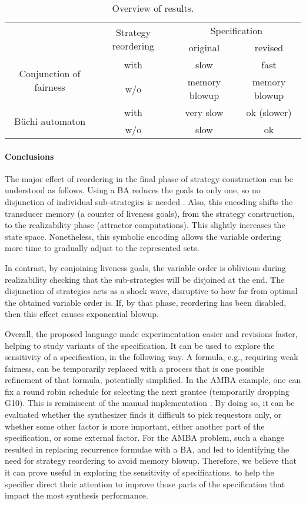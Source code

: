 \documentclass[copyright]{eptcs}
\begin{document}
\begin{table}
\caption{Overview of results.}
\label{tab:results-overview}
\centering
\begin{tabular}{cccc}
\toprule
& \multirow{2}{1.5cm}{Strategy reordering} & \multicolumn{2}{c}{Specification}\\
& & original & revised\\
\midrule
\multirow{2}{*}{Conjunction of fairness} & with & slow & fast\\
& w/o & memory blowup & memory blowup\\
\midrule
\multirow{2}{*}{B\"{u}chi automaton} & with & very slow & ok (slower)\\
& w/o & slow & ok\\
\bottomrule
\end{tabular}
\end{table}


\paragraph{Conclusions}

The major effect of reordering in the final phase of strategy construction can be understood as follows.
Using a BA reduces the goals to only one, so no disjunction of individual sub-strategies is needed \cite{Piterman06}.
Also, this encoding shifts the transducer memory (a counter of liveness goals), from the strategy construction, to the realizability phase (attractor computations).
This slightly increases the state space.
Nonetheless, this symbolic encoding allows the variable ordering more time to gradually adjust to the represented sets.

In contrast, by conjoining liveness goals, the variable order is oblivious during realizability checking that the sub-strategies will be disjoined at the end.
The disjunction of strategies acts as a shock wave, disruptive to how far from optimal the obtained variable order is.
If, by that phase, reordering has been disabled, then this effect causes exponential blowup.

Overall, the proposed language made experimentation easier and revisions faster, helping to study variants of the specification.
It can be used to explore the sensitivity of a specification, in the following way.
A formula, e.g., requiring weak fairness, can be temporarily replaced with a process that is one possible refinement of that formula, potentially simplified.
In the AMBA example, one can fix a round robin schedule for selecting the next grantee (temporarily dropping G10).
This is reminiscent of the manual implementation \cite{Bloem12jcss}.
By doing so, it can be evaluated whether the synthesizer finds it difficult to pick requestors only, or whether some other factor is more important, either another part of the specification, or some external factor.
For the AMBA problem, such a change resulted in replacing recurrence formulae with a BA, and led to identifying the need for strategy reordering to avoid memory blowup.
Therefore, we believe that it can prove useful in exploring the sensitivity of specifications, to help the specifier direct their attention to improve those parts of the specification that impact the most synthesis performance.
\end{document}
